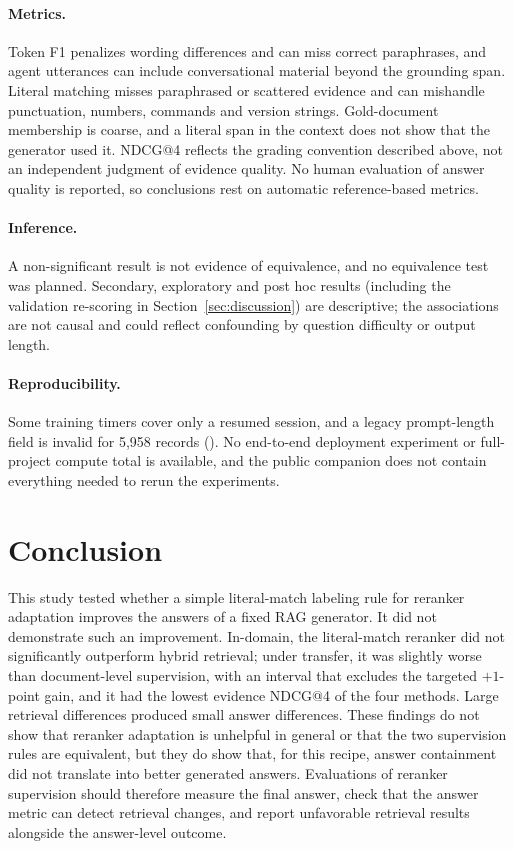 \paragraph{Metrics.} Token F1 penalizes wording differences and can miss correct paraphrases, and agent utterances can include conversational material beyond the grounding span. Literal matching misses paraphrased or scattered evidence and can mishandle punctuation, numbers, commands and version strings. Gold-document membership is coarse, and a literal span in the context does not show that the generator used it. NDCG@4 reflects the grading convention described above, not an independent judgment of evidence quality. No human evaluation of answer quality is reported, so conclusions rest on automatic reference-based metrics.

\paragraph{Inference.} A non-significant result is not evidence of equivalence, and no equivalence test was planned. Secondary, exploratory and post hoc results (including the validation re-scoring in Section~\ref{sec:discussion}) are descriptive; the associations are not causal and could reflect confounding by question difficulty or output length.

\paragraph{Reproducibility.} Some training timers cover only a resumed session, and a legacy prompt-length field is invalid for 5,958 records (). No end-to-end deployment experiment or full-project compute total is available, and the public companion does not contain everything needed to rerun the experiments.

\section{Conclusion}
This study tested whether a simple literal-match labeling rule for reranker adaptation improves the answers of a fixed RAG generator. It did not demonstrate such an improvement. In-domain, the literal-match reranker did not significantly outperform hybrid retrieval; under transfer, it was slightly worse than document-level supervision, with an interval that excludes the targeted $+1$-point gain, and it had the lowest evidence NDCG@4 of the four methods. Large retrieval differences produced small answer differences. These findings do not show that reranker adaptation is unhelpful in general or that the two supervision rules are equivalent, but they do show that, for this recipe, answer containment did not translate into better generated answers. Evaluations of reranker supervision should therefore measure the final answer, check that the answer metric can detect retrieval changes, and report unfavorable retrieval results alongside the answer-level outcome.

